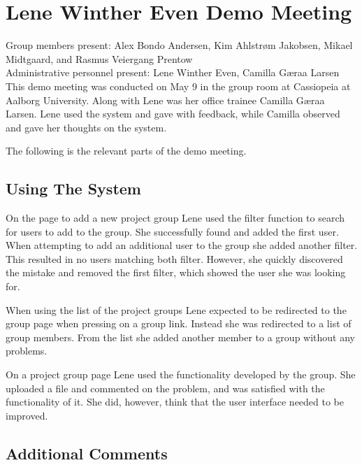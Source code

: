 \section{Lene Winther Even Demo Meeting}
\label{sec:lenedemotwo}
Group members present: Alex Bondo Andersen, Kim Ahlstr\o{}m Jakobsen, Mikael Midtgaard, and Rasmus Veiergang Prentow\\
Administrative personnel present: Lene Winther Even, Camilla G\ae{}raa Larsen\\

This demo meeting was conducted on May 9\ths{} in the group room at Cassiopeia at Aalborg University.
Along with Lene was her office trainee Camilla G\ae{}raa Larsen. 
Lene used the system and gave with feedback, while Camilla observed and gave her thoughts on the system.

The following is the relevant parts of the demo meeting.

\subsection{Using The System}
On the page to add a new project group Lene used the filter function to search for users to add to the group.
She successfully found and added the first user.
When attempting to add an additional user to the group she added another filter. 
This resulted in no users matching both filter. 
However, she quickly discovered the mistake and removed the first filter, which showed the user she was looking for.

When using the list of the project groups Lene expected to be redirected to the group page when pressing on a group link.
Instead she was redirected to a list of group members.
From the list she added another member to a group without any problems.

On a project group page Lene used the functionality developed by the \supervisorgroup group.
She uploaded a file and commented on the problem, and was satisfied with the functionality of it.
She did, however, think that the user interface needed to be improved.

\subsection{Additional Comments}

